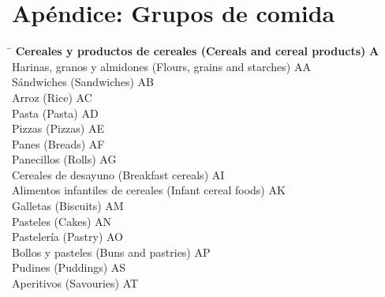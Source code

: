\chapter{Apéndice: Grupos de comida}
\label{ch:grupos-comida}

\begin{small}
    \begin{tabbing}
    \hspace{15cm} \= \hspace{0cm} \kill
        \textbf{Cereales y productos de cereales (Cereals and cereal products)} \> \textbf{A} \\
            \hspace{0.5cm}Harinas, granos y almidones (Flours, grains and starches) \> AA \\
            \hspace{0.5cm}Sándwiches (Sandwiches) \> AB \\
            \hspace{0.5cm}Arroz (Rice) \> AC \\
            \hspace{0.5cm}Pasta (Pasta) \> AD \\
            \hspace{0.5cm}Pizzas (Pizzas) \> AE \\
            \hspace{0.5cm}Panes (Breads) \> AF \\
            \hspace{0.5cm}Panecillos (Rolls) \> AG \\
            \hspace{0.5cm}Cereales de desayuno (Breakfast cereals) \> AI \\
            \hspace{0.5cm}Alimentos infantiles de cereales (Infant cereal foods) \> AK \\
            \hspace{0.5cm}Galletas (Biscuits) \> AM \\
            \hspace{0.5cm}Pasteles (Cakes) \> AN \\
            \hspace{0.5cm}Pastelería (Pastry) \> AO \\
            \hspace{0.5cm}Bollos y pasteles (Buns and pastries) \> AP \\
            \hspace{0.5cm}Pudines (Puddings) \> AS \\
            \hspace{0.5cm}Aperitivos (Savouries) \> AT \\
    \end{tabbing}


\end{small}
